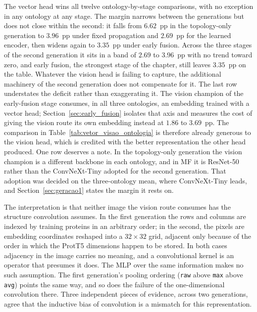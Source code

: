 \documentclass[Ingles]{ic-tese-v3}
\begin{document}
The vector head wins all twelve ontology-by-stage comparisons, with no exception in any
ontology at any stage. The margin narrows between the generations but does not close within
the second: it falls from $6.62$~pp in the topology-only generation to $3.96$~pp under fixed
propagation and $2.69$~pp for the learned encoder, then widens again to $3.35$~pp under early
fusion. Across the three stages of the second generation it sits in a band of $2.69$ to
$3.96$~pp with no trend toward zero, and early fusion, the strongest stage of the chapter,
still leaves $3.35$~pp on the table. Whatever the vision head is failing to capture, the
additional machinery of the second generation does not compensate for it.
The last row understates the deficit rather than exaggerating it. The vision champion of the
early-fusion stage consumes, in all three ontologies, an embedding trained with a
vector head; Section~\ref{sec:early_fusion} isolates that axis and measures the cost of
giving the vision route its own embedding instead at $1.86$ to $3.69$~pp. The comparison in
Table~\ref{tab:vetor_visao_ontologia} is therefore already generous to the vision head, which
is credited with the better representation the other head produced.
One row deserves a note. In the topology-only generation the vision champion is a different
backbone in each ontology, and in MF it is ResNet-50 rather than the ConvNeXt-Tiny adopted
for the second generation. That adoption was decided on the three-ontology mean, where
ConvNeXt-Tiny leads, and Section~\ref{sec:geracao1} states the margin it rests on.

The interpretation is that neither image the vision route consumes has the structure
convolution assumes. In the first generation the rows and columns are indexed by training
proteins in an arbitrary order; in the second, the pixels are embedding coordinates reshaped into
a $32 \times 32$ grid, adjacent only because of the order in which the ProtT5 dimensions happen to
be stored. In both cases adjacency in the image carries no meaning, and a convolutional kernel is
an operator that presumes it does. The MLP over the same information makes no such assumption. The
first generation's pooling ordering (\texttt{raw} above \texttt{max} above \texttt{avg})
points the same way, and so does the failure of the one-dimensional convolution there.
Three independent pieces of evidence, across two generations, agree that the inductive bias
of convolution is a mismatch for this representation.

\end{document}
